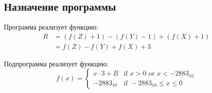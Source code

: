 \newcommand\maxSign{2^{15}-1}
\newcommand\minSign{-2^{15}}
\newcommand\aConst{-2883}
\newcommand\bConst{122}
\newcommand\minToConstInterv{[\minSign; \aConst)}
\newcommand\constInterval{[\aConst; 0]}
\newcommand\zeroToMax{(0;\maxSign]}

\subsection{Назначение программы}
Программа реализует функцию:
\begin{align*}
    R &= (f(Z) + 1) - (f(Y) - 1) + (f(X) + 1) \\
      &= f(Z) - f(Y) + f(X) + 3
\end{align*}


Подпрограмма реализует функцию:
\begin{equation*}
f(x) =
\begin{cases}
    x \cdot 3 + B & \text{if } x > 0 \text{ or } x < -2883_{10} \\
    -2883_{10} &         \text{if } -2883_{10} \le x \le 0
\end{cases}
\end{equation*}



